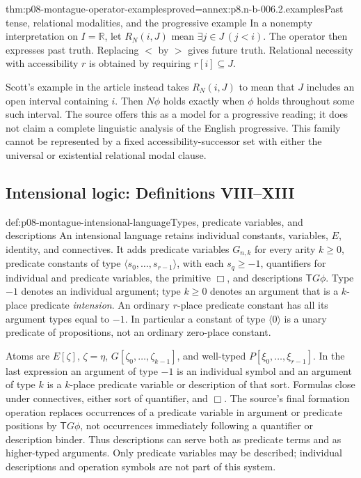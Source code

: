 \begin{hbtheorem}{thm:p08-montague-operator-examples}{proved=annex:p8.n-b-006.2.examples}{Past tense, relational modalities, and the progressive example}
In a nonempty interpretation on \(I=\mathbb R\), let \(R_N(i,J)\) mean
\(\exists j\in J\,(j<i)\). The operator then expresses past truth.
Replacing \(<\) by \(>\) gives future truth. Relational necessity
with accessibility \(r\) is obtained by requiring \(r[i]\subseteq J\).

Scott's example in the article instead takes \(R_N(i,J)\) to mean that
\(J\) includes an open interval containing \(i\). Then \(N\phi\)
holds exactly when \(\phi\) holds throughout some such interval. The
source offers this as a model for a progressive reading; it does not
claim a complete linguistic analysis of the English progressive. This
family cannot be represented by a fixed accessibility-successor set
with either the universal or existential relational modal clause.
\end{hbtheorem}

\subsection{Intensional logic: Definitions VIII--XIII}

\begin{hbdefinition}{def:p08-montague-intensional-language}{Types, predicate variables, and descriptions}
An intensional language retains individual constants, variables, \(E\),
identity, and connectives. It adds predicate variables \(G_{n,k}\) for
every arity \(k\geq0\), predicate constants of type
\(\langle s_0,\ldots,s_{r-1}\rangle\), with each \(s_q\geq-1\),
quantifiers for individual and predicate variables, the primitive
\(\Box\), and descriptions \(\mathsf T G\phi\).
Type \(-1\) denotes an individual argument; type \(k\geq0\) denotes
an argument that is a \(k\)-place predicate \emph{intension}.
An ordinary \(r\)-place predicate constant has all its argument types
equal to \(-1\). In particular a constant of type \(\langle0\rangle\)
is a unary predicate of propositions, not an ordinary zero-place constant.

Atoms are \(E[\zeta]\), \(\zeta=\eta\),
\(G[\zeta_0,\ldots,\zeta_{k-1}]\), and well-typed
\(P[\xi_0,\ldots,\xi_{r-1}]\). In the last expression an argument of
type \(-1\) is an individual symbol and an argument of type \(k\)
is a \(k\)-place predicate variable or description of that sort.
Formulas close under connectives, either sort of quantifier, and \(\Box\).
The source's final formation operation replaces occurrences of a predicate
variable in argument or predicate positions by \(\mathsf T G\phi\),
not occurrences immediately following a quantifier or description binder.
Thus descriptions can serve both as predicate terms and as higher-typed
arguments. Only predicate variables may be described; individual
descriptions and operation symbols are not part of this system.
\end{hbdefinition}

